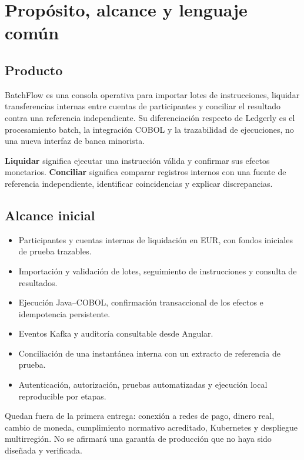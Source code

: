 \chapter{Propósito, alcance y lenguaje común}
\section{Producto}
BatchFlow es una consola operativa para importar lotes de instrucciones, liquidar transferencias internas entre cuentas de participantes y conciliar el resultado contra una referencia independiente. Su diferenciación respecto de Ledgerly es el procesamiento batch, la integración COBOL y la trazabilidad de ejecuciones, no una nueva interfaz de banca minorista.

\textbf{Liquidar} significa ejecutar una instrucción válida y confirmar sus efectos monetarios. \textbf{Conciliar} significa comparar registros internos con una fuente de referencia independiente, identificar coincidencias y explicar discrepancias.

\section{Alcance inicial}
\begin{itemize}
\item Participantes y cuentas internas de liquidación en EUR, con fondos iniciales de prueba trazables.
\item Importación y validación de lotes, seguimiento de instrucciones y consulta de resultados.
\item Ejecución Java--COBOL, confirmación transaccional de los efectos e idempotencia persistente.
\item Eventos Kafka y auditoría consultable desde Angular.
\item Conciliación de una instantánea interna con un extracto de referencia de prueba.
\item Autenticación, autorización, pruebas automatizadas y ejecución local reproducible por etapas.
\end{itemize}

Quedan fuera de la primera entrega: conexión a redes de pago, dinero real, cambio de moneda, cumplimiento normativo acreditado, Kubernetes y despliegue multirregión. No se afirmará una garantía de producción que no haya sido diseñada y verificada.

